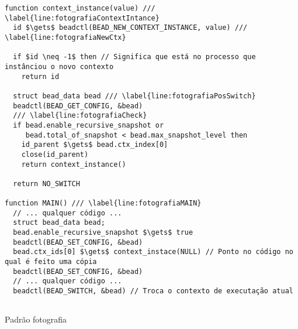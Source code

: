 \begin{pseudocode}
\begin{lstlisting}[language=pseudocode, style=pseudocode]
function context_instance(value) /// \label{line:fotografiaContextIntance}
  id $\gets$ beadctl(BEAD_NEW_CONTEXT_INSTANCE, value) /// \label{line:fotografiaNewCtx}

  if $id \neq -1$ then // Significa que está no processo que instânciou o novo contexto
    return id

  struct bead_data bead /// \label{line:fotografiaPosSwitch}
  beadctl(BEAD_GET_CONFIG, &bead)
  /// \label{line:fotografiaCheck}
  if bead.enable_recursive_snapshot or
     bead.total_of_snapshot < bead.max_snapshot_level then
    id_parent $\gets$ bead.ctx_index[0]
    close(id_parent)
    return context_instance()

  return NO_SWITCH

function MAIN() /// \label{line:fotografiaMAIN}
  // ... qualquer código ...
  struct bead_data bead;
  bead.enable_recursive_snapshot $\gets$ true
  beadctl(BEAD_SET_CONFIG, &bead)
  bead.ctx_ids[0] $\gets$ context_instace(NULL) // Ponto no código no qual é feito uma cópia
  beadctl(BEAD_SET_CONFIG, &bead)
  // ... qualquer código ...
  beadctl(BEAD_SWITCH, &bead) // Troca o contexto de executação atual
  
\end{lstlisting}

  \caption{Padrão fotografia}
  \label{alg:fotografia}
\end{pseudocode}
